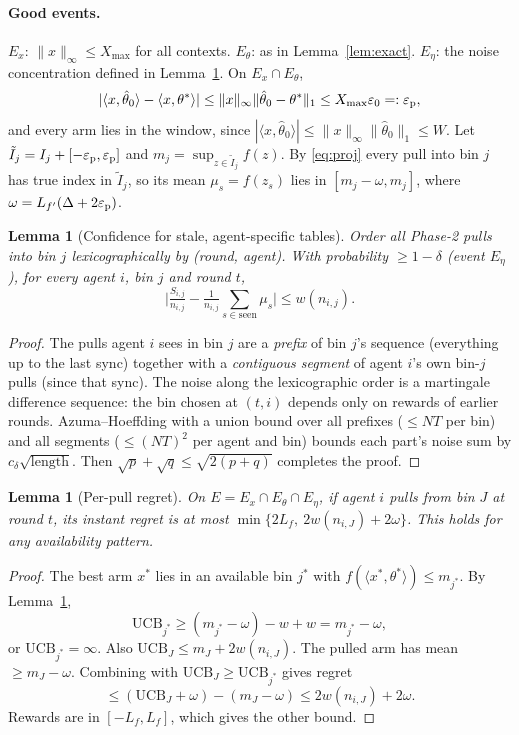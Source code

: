 \documentclass[11pt]{article}
\newtheorem{lemma}[theorem]{Lemma}
\theoremstyle{definition}
\newcommand{\Xmax}{X_{\max}}
\newcommand{\eps}{\varepsilon}
\begin{document}
\paragraph{Good events.}
$E_x$: $\|x\|_\infty\le\Xmax$ for all contexts. $E_\theta$: as in Lemma~\ref{lem:exact}.
$E_\eta$: the noise concentration defined in Lemma~\ref{lem:conf}. On $E_x\cap E_\theta$,
\begin{equation}\label{eq:proj}
|\langle x,\hat\theta_0\rangle-\langle x,\theta^*\rangle|\le\|x\|_\infty\|\hat\theta_0-\theta^*\|_1\le\Xmax\eps_0=:\eps_{\rm p},
\end{equation}
and every arm lies in the window, since $|\langle x,\hat\theta_0\rangle|\le\|x\|_\infty\|\hat\theta_0\|_1\le W$.
Let $\tilde I_j=I_j+[-\eps_{\rm p},\eps_{\rm p}]$ and $m_j=\sup_{z\in\tilde I_j}f(z)$. By
\eqref{eq:proj} every pull into bin $j$ has true index in $\tilde I_j$, so its mean
$\mu_s=f(z_s)$ lies in $[m_j-\omega,m_j]$, where $\omega=L_{f'}(\Delta+2\eps_{\rm p})$.

\begin{lemma}[Confidence for stale, agent-specific tables]\label{lem:conf}
Order all Phase-2 pulls into bin $j$ lexicographically by (round, agent). With probability
$\ge1-\delta$ (event $E_\eta$), for every agent $i$, bin $j$ and round $t$,
\[
\Big|\tfrac{S_{i,j}}{n_{i,j}}-\tfrac1{n_{i,j}}\textstyle\sum_{s\in\text{seen}}\mu_s\Big|\le w(n_{i,j}).
\]
\end{lemma}
\begin{proof}
The pulls agent $i$ sees in bin $j$ are a \emph{prefix} of bin $j$'s sequence (everything up to
the last sync) together with a \emph{contiguous segment} of agent $i$'s own bin-$j$ pulls (since
that sync). The noise along the lexicographic order is a martingale difference sequence: the
bin chosen at $(t,i)$ depends only on rewards of earlier rounds. Azuma--Hoeffding with a union
bound over all prefixes ($\le NT$ per bin) and all segments ($\le(NT)^2$ per agent and bin)
bounds each part's noise sum by $c_\delta\sqrt{\text{length}}$. Then
$\sqrt{p}+\sqrt{q}\le\sqrt{2(p+q)}$ completes the proof.
\end{proof}

\begin{lemma}[Per-pull regret]\label{lem:perpull}
On $E=E_x\cap E_\theta\cap E_\eta$, if agent $i$ pulls from bin $J$ at round $t$, its instant
regret is at most $\min\{2L_f,\ 2w(n_{i,J})+2\omega\}$. This holds for \emph{any} availability
pattern.
\end{lemma}
\begin{proof}
The best arm $x^*$ lies in an available bin $j^*$ with $f(\langle x^*,\theta^*\rangle)\le m_{j^*}$.
By Lemma~\ref{lem:conf},
\[
\mathrm{UCB}_{j^*}\ge(m_{j^*}-\omega)-w+w=m_{j^*}-\omega,
\]
or $\mathrm{UCB}_{j^*}=\infty$. Also $\mathrm{UCB}_J\le m_J+2w(n_{i,J})$. The pulled arm has
mean $\ge m_J-\omega$. Combining with $\mathrm{UCB}_J\ge\mathrm{UCB}_{j^*}$ gives regret
\[
\le(\mathrm{UCB}_J+\omega)-(m_J-\omega)\le2w(n_{i,J})+2\omega.
\]
Rewards are in $[-L_f,L_f]$, which gives the other bound.
\end{proof}
\end{document}
